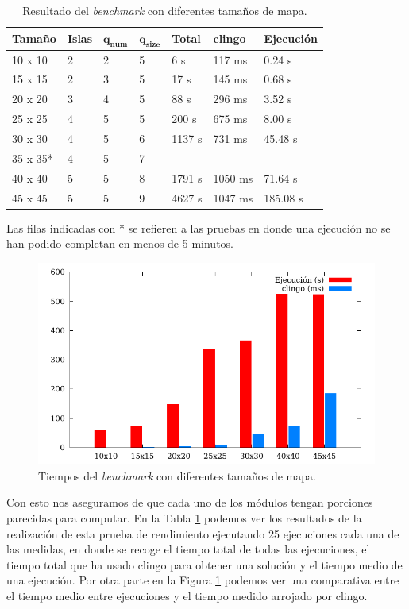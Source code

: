 \begin{table}[!h]
	\begin{tabularx}{\textwidth}{ X X X X X X X }
		\bfseries{Tamaño} & \bfseries{Islas} & $\mathbf{q_{num}}$ & $\mathbf{q_{size}}$ & \bfseries{Total}  & \bfseries{clingo} & \bfseries{Ejecución} \\
		\hline
		10 x 10 & 2 & 2 & 5 & 6 s & 117 ms & 0.24 s \\
		15 x 15 & 2 & 3 & 5 & 17 s & 145 ms & 0.68 s  \\
		20 x 20 & 3 & 4 & 5 & 88 s & 296 ms & 3.52 s \\
		25 x 25 & 4 & 5 & 5 & 200 s & 675 ms & 8.00 s \\
		30 x 30 & 4 & 5 & 6 & 1137 s & 731 ms & 45.48 s \\
		35 x 35* & 4 & 5 & 7 & - & - & - \\
		40 x 40 & 5 & 5 & 8 & 1791 s & 1050 ms & 71.64 s \\
		45 x 45 & 5 & 5 & 9 & 4627 s & 1047 ms & 185.08 s \\
		\hline
	\end{tabularx}
	\begin{tablenotes}
		\item[1] Las filas indicadas con * se refieren a las pruebas en donde una ejecución no se han podido completan en menos de 5 minutos.
	\end{tablenotes}
	\caption{Resultado del \textit{benchmark} con diferentes tamaños de mapa.}\label{table:mapresult}
\end{table}

\begin{figure}[!h]
	\centering
	\includegraphics[width=.8\textwidth]{tables/map-size.pdf}
	\caption{Tiempos del \textit{benchmark} con diferentes tamaños de mapa.}\label{fig:mapresult}
\end{figure}

Con esto nos aseguramos de que cada uno de los módulos tengan porciones parecidas para computar. En la Tabla \ref{table:mapresult} podemos ver los resultados de la realización de esta prueba de rendimiento ejecutando 25 ejecuciones cada una de las medidas, en donde se recoge el tiempo total de todas las ejecuciones, el tiempo total que ha usado clingo para obtener una solución y el tiempo medio de una ejecución. Por otra parte en la Figura \ref{fig:mapresult} podemos ver una comparativa entre el tiempo medio entre ejecuciones y el tiempo medido arrojado por clingo. \\

